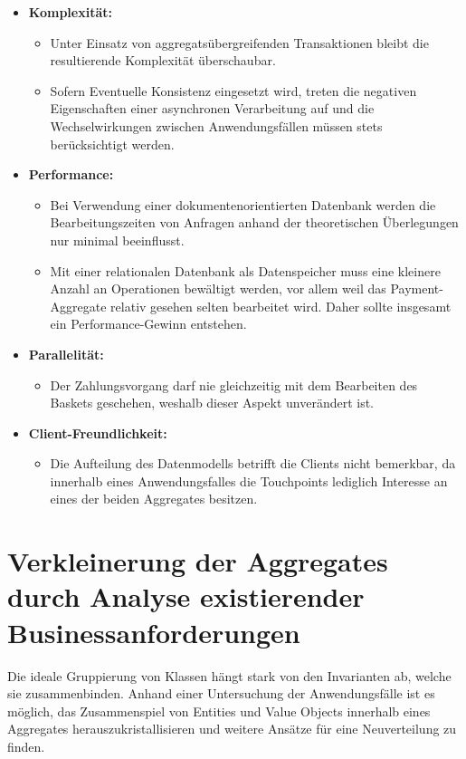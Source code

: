 \begin{itemize}[noitemsep,nolistsep,topsep=-2pt]
	\item \textbf{Komplexität: } {
		\begin{itemize}
			\item {Unter Einsatz von aggregatsübergreifenden Transaktionen bleibt die resultierende Komplexität überschaubar.}
			\item {Sofern Eventuelle Konsistenz eingesetzt wird, treten die negativen Eigenschaften einer asynchronen Verarbeitung auf und die Wechselwirkungen zwischen Anwendungsfällen müssen stets berücksichtigt werden.}
		\end{itemize}
	}
	\item \textbf{Performance: } {
		\begin{itemize}
			\item Bei Verwendung einer dokumentenorientierten Datenbank werden die Bearbeitungszeiten von Anfragen anhand der theoretischen Überlegungen nur minimal beeinflusst.
			\item Mit einer relationalen Datenbank als Datenspeicher muss eine kleinere Anzahl an Operationen bewältigt werden, vor allem weil das Payment-Aggregate relativ gesehen selten bearbeitet wird. Daher sollte insgesamt ein Performance-Gewinn entstehen. 
		\end{itemize}
	}
	\item \textbf{Parallelität: } {
		\begin{itemize}
			\item Der Zahlungsvorgang darf nie gleichzeitig mit dem Bearbeiten des Baskets geschehen, weshalb dieser Aspekt unverändert ist. 
		\end{itemize}	
	}
	\item \textbf{Client-Freundlichkeit: } {
		\begin{itemize}
			\item Die Aufteilung des Datenmodells betrifft die Clients nicht bemerkbar, da innerhalb eines Anwendungsfalles die Touchpoints lediglich Interesse an eines der beiden Aggregates besitzen.
		\end{itemize}
	}
\end{itemize}


\section{Verkleinerung der Aggregates durch Analyse existierender Businessanforderungen}

Die ideale Gruppierung von Klassen hängt stark von den Invarianten ab, welche sie zusammenbinden. Anhand einer Untersuchung der Anwendungsfälle ist es möglich, das Zusammenspiel von Entities und Value Objects innerhalb eines Aggregates herauszukristallisieren und weitere Ansätze für eine Neuverteilung zu finden.

